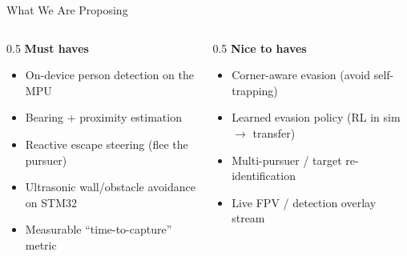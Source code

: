 \documentclass[aspectratio=169]{beamer}
\begin{document}
\begin{frame}{What We Are Proposing}
  \vspace{0pt}
  \begin{columns}[T]
    \begin{column}{0.5\textwidth}
      \textbf{\color{ucsdblue}Must haves}
      \begin{itemize}[itemsep=0pt,parsep=0pt,topsep=2pt]\small
        \item On-device person detection on the MPU
        \item Bearing + proximity estimation
        \item Reactive escape steering (flee the pursuer)
        \item Ultrasonic wall/obstacle avoidance on STM32
        \item Measurable ``time-to-capture'' metric
      \end{itemize}
    \end{column}
    \begin{column}{0.5\textwidth}
      \textbf{\color{ucsdblue}Nice to haves}
      \begin{itemize}[itemsep=0pt,parsep=0pt,topsep=2pt]\small
        \item Corner-aware evasion (avoid self-trapping)
        \item Learned evasion policy (RL in sim $\rightarrow$ transfer)
        \item Multi-pursuer / target re-identification
        \item Live FPV / detection overlay stream
      \end{itemize}
    \end{column}
  \end{columns}
\end{frame}
\end{document}
